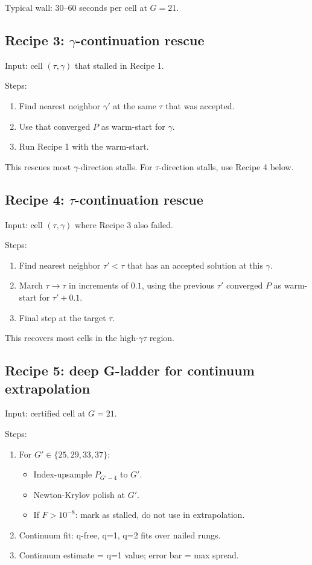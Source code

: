\documentclass[11pt]{article}
\newcommand{\1}{\mathbf{1}}
\begin{document}
Typical wall: 30--60 seconds per cell at $G=21$.

\subsection{Recipe 3: $\gamma$-continuation rescue}

Input: cell $(\tau, \gamma)$ that stalled in Recipe 1.

Steps:
\begin{enumerate}
\item Find nearest neighbor $\gamma'$ at the same $\tau$ that was accepted.
\item Use that converged $P$ as warm-start for $\gamma$.
\item Run Recipe 1 with the warm-start.
\end{enumerate}

This rescues most $\gamma$-direction stalls.  For $\tau$-direction stalls,
use Recipe 4 below.

\subsection{Recipe 4: $\tau$-continuation rescue}

Input: cell $(\tau, \gamma)$ where Recipe 3 also failed.

Steps:
\begin{enumerate}
\item Find nearest neighbor $\tau' < \tau$ that has an accepted solution
at this $\gamma$.
\item March $\tau \to \tau$ in increments of $0.1$, using the previous
$\tau'$ converged $P$ as warm-start for $\tau' + 0.1$.
\item Final step at the target $\tau$.
\end{enumerate}

This recovers most cells in the high-$\gamma\tau$ region.

\subsection{Recipe 5: deep G-ladder for continuum extrapolation}

Input: certified cell at $G=21$.

Steps:
\begin{enumerate}
\item For $G' \in \{25, 29, 33, 37\}$:
\begin{itemize}
\item Index-upsample $P_{G'-4}$ to $G'$.
\item Newton-Krylov polish at $G'$.
\item If $F > 10^{-8}$: mark as stalled, do not use in extrapolation.
\end{itemize}
\item Continuum fit: q-free, q=1, q=2 fits over nailed rungs.
\item Continuum estimate = q=1 value; error bar = max spread.
\end{enumerate}
\end{document}
